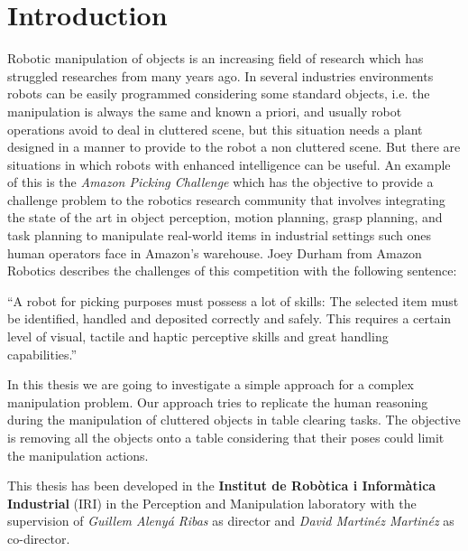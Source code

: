 \chapter{Introduction}
\label{ch:introduction}

Robotic manipulation of objects is an increasing field of research which has struggled researches from many years ago. In several industries environments robots can be easily programmed considering some standard objects, i.e. the manipulation is always the same and known a priori, and usually robot operations avoid to deal in cluttered scene, but this situation needs a plant designed in a manner to provide to the robot a non cluttered scene. 
But there are situations in which robots with enhanced intelligence can be useful. An example of this is the \textit{Amazon Picking Challenge} \citep{APC} which has the objective to provide a challenge 
problem to the robotics research community that involves integrating the state of the art in object perception, 
motion planning, grasp planning, and task planning to manipulate real-world items in industrial settings such ones human operators face in Amazon's warehouse. Joey Durham from Amazon Robotics describes the challenges of this competition with the following sentence:
\begin{displayquote}
 “A robot for picking purposes must possess a lot of skills: The selected item must be identified, handled and deposited correctly and safely. This requires a certain level of visual, tactile and haptic perceptive skills and great handling capabilities.”
\end{displayquote}

In this thesis we are going to investigate a simple approach for a complex manipulation problem. Our approach tries to replicate the human reasoning during the manipulation of cluttered objects in table clearing tasks. The objective is removing all the objects onto a table considering that their poses could limit the manipulation actions. 

This thesis has been developed in the \textbf{Institut de Robòtica i Informàtica Industrial} (IRI) in the  Perception and Manipulation laboratory with the supervision of \textit{Guillem Alenyá Ribas} as director and \textit{David Martinéz Martinéz} as co-director. 

